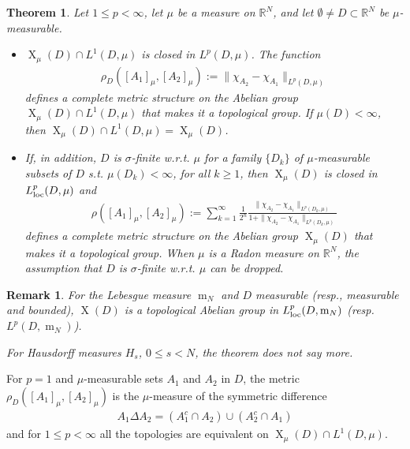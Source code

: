 \documentclass{book}
\numberwithin{equation}{section}
\newtheorem{theorem}{Theorem}[section]
\newtheorem{remark}{Remark}[section]
\begin{document}
\begin{enumerate}
    \begin{theorem}
        Let $1\le p < \infty$, let $\mu$ be a measure on $\mathbb{R}^N$, and let $\emptyset\ne D\subset\mathbb{R}^N$ be $\mu$-measurable.
        \begin{itemize}
            \item[(i)] $\operatorname{X}_\mu(D)\cap L^1(D,\mu)$ is closed in $L^p(D,\mu)$. The function
            \begin{align*}
                \rho_D([A_1]_\mu,[A_2]_\mu) := \|\chi_{A_2} - \chi_{A_1}\|_{L^p(D,\mu)}
            \end{align*}
            defines a complete metric structure on the Abelian group $\operatorname{X}_\mu(D)\cap L^1(D,\mu)$ that makes it a topological group. If $\mu(D) < \infty$, then $\operatorname{X}_\mu(D)\cap L^1(D,\mu) = \operatorname{X}_\mu(D)$.
            \item[(ii)] If, in addition, $D$ is $\sigma$-finite w.r.t. $\mu$ for a family $\{D_k\}$ of $\mu$-measurable subsets of $D$ s.t. $\mu(D_k) < \infty$, for all $k\ge 1$, then $\operatorname{X}_\mu(D)$ is closed in $L_{\rm loc}^p(D,\mu)$ and
            \begin{align*}
                \rho([A_1]_\mu,[A_2]_\mu) := \sum_{k=1}^\infty \frac{1}{2^n}\frac{\|\chi_{A_2} - \chi_{A_1}\|_{L^p(D_k,\mu)}}{1 + \|\chi_{A_2} - \chi_{A_1}\|_{L^p(D_k,\mu)}}
            \end{align*}
            defines a complete metric structure on the Abelian group $\operatorname{X}_\mu(D)$ that makes it a topological group. When $\mu$ is a Radon measure on $\mathbb{R}^N$, the assumption that $D$ is $\sigma$-finite w.r.t. $\mu$ can be dropped.        
        \end{itemize}
    \end{theorem}
    \begin{remark}
        For the Lebesgue measure $\operatorname{m}_N$ and $D$ measurable (resp., measurable and bounded), $\operatorname{X}(D)$ is a topological Abelian group in $L_{\rm loc}^p(D,\operatorname{m}_N)$ (resp. $L^p(D,\operatorname{m}_N)$).
        
        For Hausdorff measures $H_s$, $0\le s < N$, the theorem does not say more.
    \end{remark}
    For $p = 1$ and $\mu$-measurable sets $A_1$ and $A_2$ in $D$, the metric $\rho_D([A_1]_\mu,[A_2]_\mu)$ is the $\mu$-measure of the symmetric difference
    \begin{align*}
        A_1\Delta A_2 = (A_1^c\cap A_2)\cup(A_2^c\cap A_1)
    \end{align*}
    and for $1\le p < \infty$ all the topologies are equivalent on $\operatorname{X}_\mu(D)\cap L^1(D,\mu)$.
    

\end{enumerate}
\end{document}
